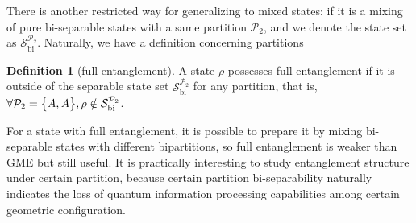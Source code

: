 \documentclass[
reprint,
aps,
pra,
floatfix,
]{revtex4-2}
\theoremstyle{plain}
\theoremstyle{definition}
\newtheorem{definition}{Definition}
\newtheorem{remark}{Remark}
\newcommand{\dm}{\rho}
\newcommand{\bi}{\text{bi}}
\newcommand{\separable}{\mathcal{S}}
\newcommand{\ppartition}{\mathcal{P}}
\begin{document}
There is another restricted way for generalizing to mixed states: 
if it is a mixing of pure bi-separable states with a same partition $\ppartition_2$, 
and we denote the state set as $\separable_{\bi}^{\ppartition_2}$. 
Naturally, we have a definition concerning partitions
\begin{definition}[full entanglement]\label{def:full_entanglement}
	A state $\dm$ possesses full entanglement
	if it is outside of the separable state set $\separable_{\bi}^{\ppartition_2}$ for any partition,
	that is, $\forall \ppartition_2 = \qty{A,\bar{A}},\dm \notin \separable_\bi^{\ppartition_2}$.
\end{definition}
For a state with full entanglement, it is possible to prepare it by mixing bi-separable states with different bipartitions,
so full entanglement is weaker than GME but still useful.
It is practically interesting to study entanglement structure under certain partition,
because certain partition bi-separability naturally indicates the loss of quantum information processing capabilities among certain geometric configuration.

\end{document}
